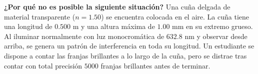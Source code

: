 \item \textbf{¿Por qué no es posible la siguiente situación?}
Una cuña delgada de material transparente ($n = 1.50$) se encuentra colocada en el aire. La cuña tiene una longitud de $0.500\text{ m}$ y una altura máxima de $1.00\text{ mm}$ en su extremo grueso. Al iluminar normalmente con luz monocromática de $632.8\text{ nm}$ y observar desde arriba, se genera un patrón de interferencia en toda su longitud. Un estudiante se dispone a contar las franjas brillantes a lo largo de la cuña, pero se distrae tras contar con total precisión $5000$ franjas brillantes antes de terminar.